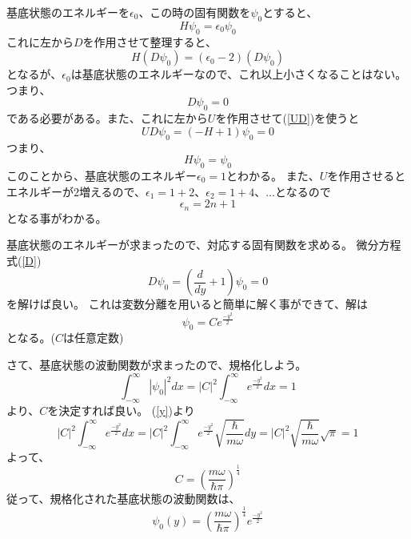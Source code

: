 基底状態のエネルギーを$\epsilon_0$、この時の固有関数を$\psi_0$とすると、
\begin{equation}
	H\psi_0 = \epsilon_0\psi_0
\end{equation}
これに左から$D$を作用させて整理すると、
\begin{equation}
	H(D\psi_0) = (\epsilon_0 - 2)(D\psi_0)
\end{equation}
となるが、$\epsilon_0$は基底状態のエネルギーなので、これ以上小さくなることはない。
つまり、
\begin{equation}
	\label{D}
	D\psi_0 = 0
\end{equation}
である必要がある。また、これに左から$U$を作用させて(\ref{UD})を使うと
\begin{equation}
	UD\psi_0 = (-H+1)\psi_0 = 0
\end{equation}
つまり、
\begin{equation}
	H\psi_0 = \psi_0
\end{equation}
このことから、基底状態のエネルギー$\epsilon_0 = 1$とわかる。
また、$U$を作用させるとエネルギーが$2$増えるので、$\epsilon_1 = 1+2$、$\epsilon_2 = 1+4$、$\ldots$となるので
\begin{equation}
  \label{eps_requirement2}
  \epsilon_n = 2n + 1
\end{equation}
となる事がわかる。

基底状態のエネルギーが求まったので、対応する固有関数を求める。
微分方程式(\ref{D})
\begin{equation}
	D\psi_0 = \left( \dfrac{d}{dy} +1 \right)\psi_0 = 0
\end{equation}
を解けば良い。
これは変数分離を用いると簡単に解く事ができて、解は
\begin{equation}
	\psi_0 = Ce^{\frac{-y^2}{2}}
\end{equation}
となる。($C$は任意定数)

さて、基底状態の波動関数が求まったので、規格化しよう。
\begin{equation}
	\int_{-\infty}^\infty |\psi_0|^2 dx = |C|^2 \int_{-\infty}^\infty e^{\frac{-y^2}{2}} dx = 1
\end{equation}
より、$C$を決定すれば良い。
(\ref{y})より
\begin{equation}
	|C|^2 \int_{-\infty}^\infty e^{\frac{-y^2}{2}} dx = |C|^2 \int_{-\infty}^\infty e^{\frac{-y^2}{2}} \sqrt{\dfrac{\hbar}{m\omega}}dy
	= |C|^2\sqrt{\dfrac{\hbar}{m\omega}}\sqrt{\pi} = 1
\end{equation}
よって、
\begin{equation}
	C = \left( \dfrac{m\omega}{\hbar\pi} \right)^\frac{1}{4}
\end{equation}
従って、規格化された基底状態の波動関数は、
\begin{equation}
	\psi_0(y) = \left( \dfrac{m\omega}{\hbar\pi} \right)^\frac{1}{4}e^{\frac{-y^2}{2}}
\end{equation}

